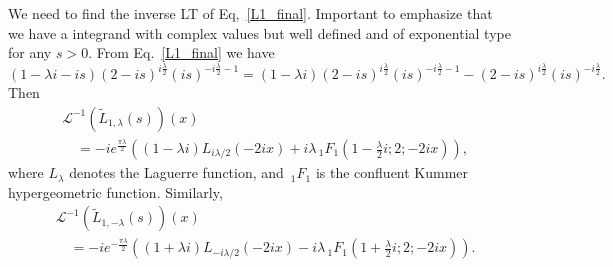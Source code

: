 \documentclass[%
 aip,
 jmp,%
 amsmath,amssymb,
 reprint,%
]{revtex4-2}
\begin{document}
We need to find the inverse LT of Eq,~\eqref{L1_final}. Important to emphasize that we have a integrand with complex values but well defined and of exponential type for any $s > 0$.
From Eq.~\eqref{L1_final} we have
\begin{equation}\label{eq:L1_final-2}
    (1-\lambda i-i s) (2-i s)^{i\frac{\lambda}{2} } (i s)^{-i\frac{\lambda}{2}-1} = (1-\lambda i) (2-i s)^{i\frac{\lambda}{2} } (i s)^{-i\frac{\lambda}{2}-1} -  (2-i s)^{i\frac{\lambda}{2} } (i s)^{-i\frac{\lambda}{2}}.
\end{equation}
Then
\[
\boxed{\begin{aligned}
& \mathcal L^{-1}\left(\widetilde L_{1,\lambda} (s) \right)(x)\\
& \quad =  -i e^{\frac{\pi  \lambda}{2}}  \left( (1-\lambda i)  L_{i \lambda/2}(-2 i x)  + i\lambda \, _1F_1\left(1- \frac{\lambda}2 i ;2;-2 i x \right) \right),
\end{aligned}}
\]
where $L_\lambda$ denotes the Laguerre function, and $\,_1F_1$ is the confluent Kummer hypergeometric function. Similarly, 
\[
\boxed{\begin{aligned}
& \mathcal L^{-1}\left(\widetilde L_{1,-\lambda} (s) \right)(x)\\
& \quad = -i  e^{-\frac{\pi  \lambda}{2}}   \left( (1+ \lambda i)L_{-i \lambda/2}(-2 i x) - i\lambda \, _1F_1\left(1+  \frac{\lambda}2i ;2;-2 i x \right) \right).
\end{aligned}}
\]
\end{document}

